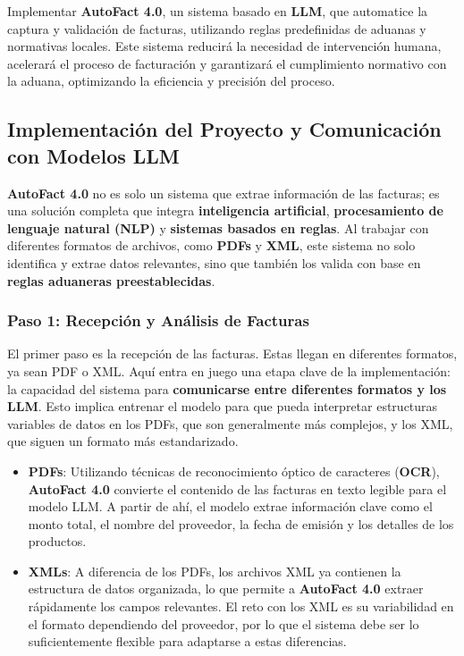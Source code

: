 Implementar \textbf{AutoFact 4.0}, un sistema basado en \textbf{LLM}, que automatice la captura y validación de facturas, utilizando reglas predefinidas de aduanas y normativas locales. Este sistema reducirá la necesidad de intervención humana, acelerará el proceso de facturación y garantizará el cumplimiento normativo con la aduana, optimizando la eficiencia y precisión del proceso.

\subsection{Implementación del Proyecto y Comunicación con Modelos LLM}

\textbf{AutoFact 4.0} no es solo un sistema que extrae información de las facturas; es una solución completa que integra \textbf{inteligencia artificial}, \textbf{procesamiento de lenguaje natural (NLP)} y \textbf{sistemas basados en reglas}. Al trabajar con diferentes formatos de archivos, como \textbf{PDFs} y \textbf{XML}, este sistema no solo identifica y extrae datos relevantes, sino que también los valida con base en \textbf{reglas aduaneras preestablecidas}.

\subsubsection{Paso 1: Recepción y Análisis de Facturas}

El primer paso es la recepción de las facturas. Estas llegan en diferentes formatos, ya sean PDF o XML. Aquí entra en juego una etapa clave de la implementación: la capacidad del sistema para \textbf{comunicarse entre diferentes formatos y los LLM}. Esto implica entrenar el modelo para que pueda interpretar estructuras variables de datos en los PDFs, que son generalmente más complejos, y los XML, que siguen un formato más estandarizado.

\begin{itemize}
    \item \textbf{PDFs}: Utilizando técnicas de reconocimiento óptico de caracteres (\textbf{OCR}), \textbf{AutoFact 4.0} convierte el contenido de las facturas en texto legible para el modelo LLM. A partir de ahí, el modelo extrae información clave como el monto total, el nombre del proveedor, la fecha de emisión y los detalles de los productos.
    \item \textbf{XMLs}: A diferencia de los PDFs, los archivos XML ya contienen la estructura de datos organizada, lo que permite a \textbf{AutoFact 4.0} extraer rápidamente los campos relevantes. El reto con los XML es su variabilidad en el formato dependiendo del proveedor, por lo que el sistema debe ser lo suficientemente flexible para adaptarse a estas diferencias.
\end{itemize}

